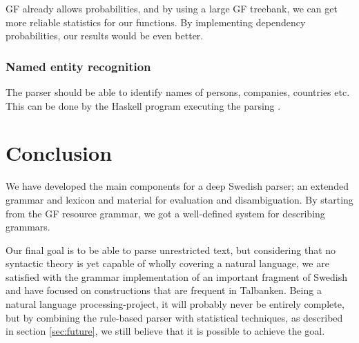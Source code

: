 \documentclass{report}
\begin{document}
GF already allows probabilities, and by using a large
GF treebank, we can get more reliable statistics for our functions. 
By implementing dependency probabilities, our results would be even better.

\subsubsection{Named entity recognition}
The parser should be able to identify names of persons, companies, countries etc.
This can be done by the Haskell program executing the parsing \cite{patent}.






\section{Conclusion}


We have developed the main components
for a deep Swedish parser; an extended grammar and lexicon and material for
evaluation and disambiguation. %
By starting from the GF resource grammar, we got a well-defined system for
describing grammars. 


Our final goal is to be able to parse unrestricted text, but considering that
no syntactic theory is yet capable
of wholly covering a natural language, we are satisfied with %
the grammar implementation of an important fragment of Swedish and have
focused on constructions that are frequent in Talbanken. 
Being a natural language processing-project, it will probably never be
entirely complete, but by combining the rule-based parser with statistical
techniques, 
as described in section \ref{sec:future},
we still believe that it is possible to achieve the goal. 
\\
\end{document}
